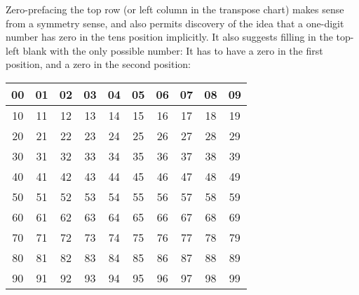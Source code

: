 \documentclass[12pt]{article}
\newcommand{\tablesize}{\footnotesize\sffamily}
\begin{document}
Zero-prefacing the top row (or left column in the transpose chart)
makes sense from a symmetry sense, and also permits discovery of the
idea that a one-digit number has zero in the tens position implicitly.
It also suggests filling in the top-left blank with the only possible
number: It has to have a zero in the first position, and a zero in the
second position:
\begin{center}\tablesize
\begin{tabular}{|c|c|c|c|c|c|c|c|c|c|}
\hline
 00 & 01 & 02 & 03 & 04 & 05 & 06 & 07 & 08 & 09 \\ \hline
 10 & 11 & 12 & 13 & 14 & 15 & 16 & 17 & 18 & 19 \\ \hline
 20 & 21 & 22 & 23 & 24 & 25 & 26 & 27 & 28 & 29 \\ \hline
 30 & 31 & 32 & 33 & 34 & 35 & 36 & 37 & 38 & 39 \\ \hline
 40 & 41 & 42 & 43 & 44 & 45 & 46 & 47 & 48 & 49 \\ \hline
 50 & 51 & 52 & 53 & 54 & 55 & 56 & 57 & 58 & 59 \\ \hline
 60 & 61 & 62 & 63 & 64 & 65 & 66 & 67 & 68 & 69 \\ \hline
 70 & 71 & 72 & 73 & 74 & 75 & 76 & 77 & 78 & 79 \\ \hline
 80 & 81 & 82 & 83 & 84 & 85 & 86 & 87 & 88 & 89 \\ \hline
 90 & 91 & 92 & 93 & 94 & 95 & 96 & 97 & 98 & 99 \\ \hline
\end{tabular}
\end{center}
\end{document}
